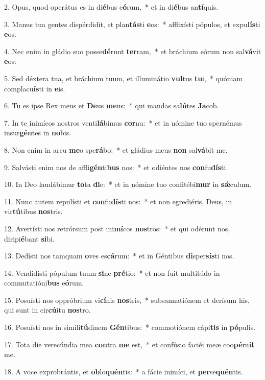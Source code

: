 2. Opus, quod operátus es in di\textbf{é}bus e\textbf{ó}rum,~*  et in di\textbf{é}bus an\textbf{tí}quis.\

3. Manus tua gentes dispérdidit, et plan\textbf{tás}ti \textbf{e}os:~*  afflixísti pópulos, et expu\textbf{lís}ti \textbf{e}os.\

4. Nec enim in gládio suo posse\textbf{dé}runt \textbf{ter}ram,~*  et bráchium eórum non sal\textbf{vá}vit \textbf{e}os:\

5. Sed déxtera tua, et bráchium tuum, et illuminátio \textbf{vul}tus \textbf{tu}i,~*  quóniam complacu\textbf{ís}ti in \textbf{e}is.\

6. Tu es ipse Rex meus et \textbf{De}us \textbf{me}us:~*  qui mandas sa\textbf{lú}tes \textbf{Ja}cob.\

7. In te inimícos nostros venti\textbf{lá}bimus \textbf{cor}nu:~*  et in nómine tuo spernémus insur\textbf{gén}tes in \textbf{no}bis.\

8. Non enim in arcu \textbf{me}o spe\textbf{rá}bo:~*  et gládius meus \textbf{non} sal\textbf{vá}bit me.\

9. Salvásti enim nos de affli\textbf{gén}ti\textbf{bus} nos:~*  et odiéntes nos \textbf{con}fu\textbf{dís}ti.\

10. In Deo laudábimur \textbf{to}ta \textbf{di}e:~*  et in nómine tuo confitébi\textbf{mur} in \textbf{sǽ}culum.\

11. Nunc autem repulísti et \textbf{con}fu\textbf{dís}ti nos:~*  et non egrediéris, Deus, in vir\textbf{tú}tibus \textbf{nos}tris.\

12. Avertísti nos retrórsum post ini\textbf{mí}cos \textbf{nos}tros:~*  et qui odérunt nos, diripi\textbf{é}bant \textbf{si}bi.\

13. Dedísti nos tamquam \textbf{o}ves es\textbf{cá}rum:~*  et in Géntibus \textbf{di}sper\textbf{sís}ti nos.\

14. Vendidísti pópulum tuum \textbf{si}ne \textbf{pré}tio:~*  et non fuit multitúdo in commutatióni\textbf{bus} e\textbf{ó}rum.\

15. Posuísti nos oppróbrium vi\textbf{cí}nis \textbf{nos}tris,~*  subsannatiónem et derísum his, qui sunt in cir\textbf{cú}itu \textbf{nos}tro.\

16. Posuísti nos in simili\textbf{tú}dinem \textbf{Gén}tibus:~*  commotiónem cápi\textbf{tis} in \textbf{pó}pulis.\

17. Tota die verecúndia mea \textbf{con}tra \textbf{me} est,~*  et confúsio faciéi meæ coo\textbf{pé}ru\textbf{it} me.\

18. A voce exprobrántis, et \textbf{ob}lo\textbf{quén}tis:~*  a fácie inimíci, et \textbf{per}se\textbf{quén}tis.\


